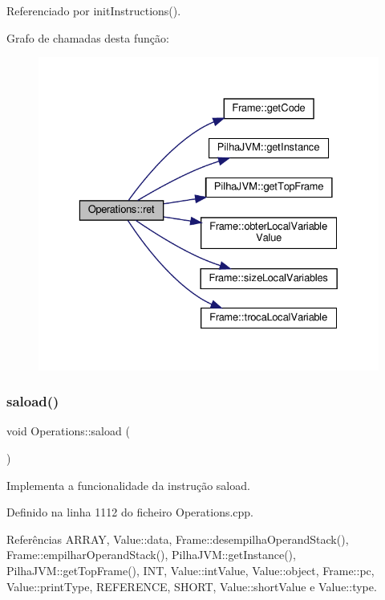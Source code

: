 Referenciado por init\+Instructions().

Grafo de chamadas desta função\+:
\nopagebreak
\begin{figure}[H]
\begin{center}
\leavevmode
\includegraphics[width=329pt]{classOperations_a3e7225adafc030be5d6e1c2b0a963a9b_cgraph}
\end{center}
\end{figure}
\mbox{\label{classOperations_ac97743869c458c3ffcda48383308e9b4}} 
\subsubsection{\texorpdfstring{saload()}{saload()}}
{\footnotesize\ttfamily void Operations\+::saload (\begin{DoxyParamCaption}{ }\end{DoxyParamCaption})\hspace{0.3cm}{\ttfamily [private]}}



Implementa a funcionalidade da instrução saload. 



Definido na linha 1112 do ficheiro Operations.\+cpp.



Referências A\+R\+R\+AY, Value\+::data, Frame\+::desempilha\+Operand\+Stack(), Frame\+::empilhar\+Operand\+Stack(), Pilha\+J\+V\+M\+::get\+Instance(), Pilha\+J\+V\+M\+::get\+Top\+Frame(), I\+NT, Value\+::int\+Value, Value\+::object, Frame\+::pc, Value\+::print\+Type, R\+E\+F\+E\+R\+E\+N\+CE, S\+H\+O\+RT, Value\+::short\+Value e Value\+::type.




